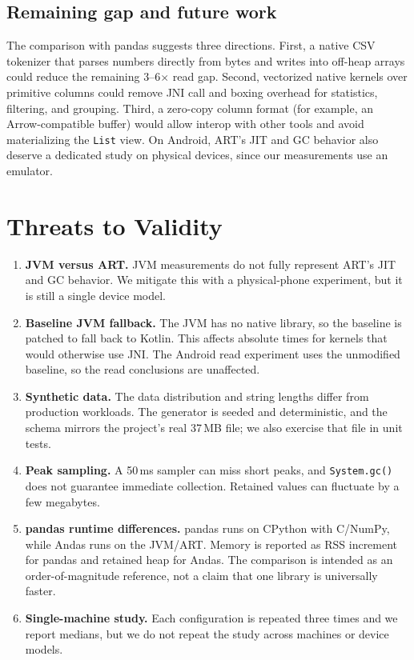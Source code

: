 \documentclass[11pt,a4paper]{article}
\newcommand{\code}[1]{\texttt{#1}}
\begin{document}
\subsection{Remaining gap and future work}

The comparison with pandas suggests three directions.  First, a native CSV tokenizer that parses
numbers directly from bytes and writes into off-heap arrays could reduce the remaining 3--6$\times$
read gap.  Second, vectorized native kernels over primitive columns could remove JNI call and
boxing overhead for statistics, filtering, and grouping.  Third, a zero-copy column format (for
example, an Arrow-compatible buffer) would allow interop with other tools and avoid materializing
the \code{List} view.  On Android, ART's JIT and GC behavior also deserve a dedicated study on
physical devices, since our measurements use an emulator.

\section{Threats to Validity}

\begin{enumerate}
  \item \textbf{JVM versus ART.}  JVM measurements do not fully represent ART's JIT and GC behavior.
        We mitigate this with a physical-phone experiment, but it is still a single device model.
  \item \textbf{Baseline JVM fallback.}  The JVM has no native library, so the baseline is patched
        to fall back to Kotlin.  This affects absolute times for kernels that would otherwise use
        JNI.  The Android read experiment uses the unmodified baseline, so the read conclusions are
        unaffected.
  \item \textbf{Synthetic data.}  The data distribution and string lengths differ from production
        workloads.  The generator is seeded and deterministic, and the schema mirrors the project's
        real 37\,MB file; we also exercise that file in unit tests.
  \item \textbf{Peak sampling.}  A 50\,ms sampler can miss short peaks, and \code{System.gc()} does
        not guarantee immediate collection.  Retained values can fluctuate by a few megabytes.
  \item \textbf{pandas runtime differences.}  pandas runs on CPython with C/NumPy, while Andas runs
        on the JVM/ART.  Memory is reported as RSS increment for pandas and retained heap for Andas.
        The comparison is intended as an order-of-magnitude reference, not a claim that one library
        is universally faster.
  \item \textbf{Single-machine study.}  Each configuration is repeated three times and we report
        medians, but we do not repeat the study across machines or device models.
\end{enumerate}
\end{document}
